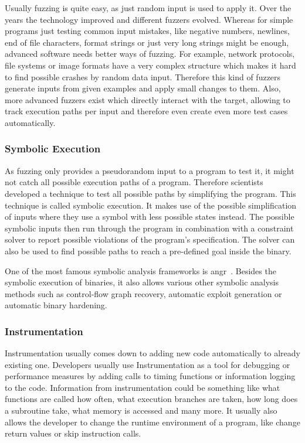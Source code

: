Usually fuzzing is quite easy, as just random input is used to apply it. Over
the years the technology improved and different fuzzers evolved. Whereas for
simple programs just testing common input mistakes, like negative numbers,
newlines, end of file characters, format strings or just very long strings might
be enough, advanced software needs better ways of fuzzing. For example, network
protocols, file systems or image formats have a very complex structure which
makes it hard to find possible crashes by random data input. Therefore this kind
of fuzzers generate inputs from given examples and apply small changes to them.
Also, more advanced fuzzers exist which directly interact with the target,
allowing to track execution paths per input and therefore even create even more
test cases automatically.


\subsubsection{Symbolic Execution}

As fuzzing only provides a pseudorandom input to a program to test it, it might
not catch all possible execution paths of a program. Therefore scientists
developed a technique to test all possible paths by simplifying the program.
This technique is called symbolic execution. It makes use of the possible
simplification of inputs where they use a symbol with less possible states
instead. The possible symbolic inputs then run through the program in
combination with a constraint solver to report possible violations of the
program's specification. The solver can also be used to find possible paths to
reach a pre-defined goal inside the binary.

One of the most famous symbolic analysis frameworks is angr~\cite{angrpaper}.
Besides the symbolic execution of binaries, it also allows various other
symbolic analysis methods such as control-flow graph recovery, automatic exploit
generation or automatic binary hardening.


\subsubsection{Instrumentation}

Instrumentation usually comes down to adding new code automatically to already
existing one. Developers usually use Instrumentation as a tool for debugging or
performance measures by adding calls to timing functions or information logging
to the code. Information from instrumentation could be something like what
functions are called how often, what execution branches are taken, how long does
a subroutine take, what memory is accessed and many more. It usually also allows
the developer to change the runtime environment of a program, like change return
values or skip instruction calls.

